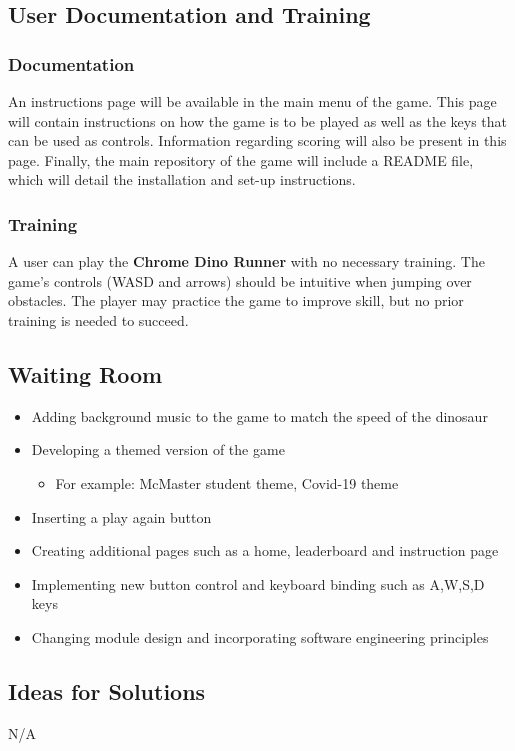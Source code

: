 \documentclass[12pt]{article}
\begin{document}
\subsection{User Documentation and Training}
\subsubsection{Documentation}
An instructions page will be available in the main menu of the game.
This page will contain instructions on how the game is to be played as well as the keys that can be used as controls. Information regarding scoring will also be present in this page.
Finally, the main repository of the game will include a README file, which will detail the installation and set-up instructions.
\subsubsection{Training}
A user can play the \textbf{Chrome Dino Runner} with no necessary training. The game's controls (WASD and arrows) should be intuitive when jumping over obstacles. The player may practice the game to improve skill, but no prior training is needed to succeed.  
\subsection{Waiting Room}
\begin{itemize}
 \item Adding background music to the game to match the speed of the dinosaur
 \item Developing a themed version of the game 
 \begin{itemize}
     \item For example: McMaster student theme, Covid-19 theme
 \end{itemize}
 \item Inserting a play again button
 \item Creating additional pages such as a home, leaderboard and  instruction page 
 \item Implementing new button control and keyboard binding such as A,W,S,D keys
 \item Changing module design and incorporating software engineering principles
\end{itemize}
\subsection{Ideas for Solutions}
N/A
\end{document}
